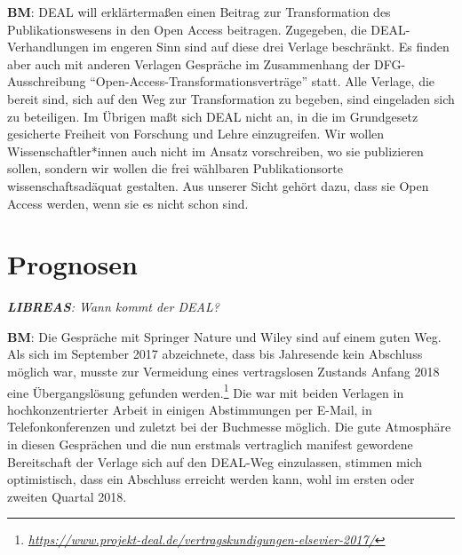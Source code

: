 \documentclass[a4paper,
fontsize=11pt,
oneside,
numbers=noperiodatend,
parskip=half-,
bibliography=totoc,
final
]{scrartcl}
\begin{document}
\textbf{BM}: DEAL will erklärtermaßen einen Beitrag zur Transformation
des Publikationswesens in den Open Access beitragen. Zugegeben, die
DEAL-Verhandlungen im engeren Sinn sind auf diese drei Verlage
beschränkt. Es finden aber auch mit anderen Verlagen Gespräche im
Zusammenhang der DFG-Ausschreibung
\enquote{Open-Access-Transformationsverträge} statt. Alle Verlage, die
bereit sind, sich auf den Weg zur Transformation zu begeben, sind
eingeladen sich zu beteiligen. Im Übrigen maßt sich DEAL nicht an, in
die im Grundgesetz gesicherte Freiheit von Forschung und Lehre
einzugreifen. Wir wollen Wissenschaftler*innen auch nicht im Ansatz
vorschreiben, wo sie publizieren sollen, sondern wir wollen die frei
wählbaren Publikationsorte wissenschaftsadäquat gestalten. Aus unserer
Sicht gehört dazu, dass sie Open Access werden, wenn sie es nicht schon
sind.

\section{Prognosen}\label{prognosen}

\emph{\textbf{LIBREAS}: Wann kommt der DEAL?}

\textbf{BM}: Die Gespräche mit Springer Nature und Wiley sind auf einem
guten Weg. Als sich im September 2017 abzeichnete, dass bis Jahresende
kein Abschluss möglich war, musste zur Vermeidung eines vertragslosen
Zustands Anfang 2018 eine Übergangslösung gefunden werden.\footnote{\href{https://www.projekt-deal.de/vertragskundigungen-elsevier-2017/}{\emph{https://www.projekt-deal.de/vertragskundigungen-elsevier-2017/}}}
Die war mit beiden Verlagen in hochkonzentrierter Arbeit in einigen
Abstimmungen per E-Mail, in Telefonkonferenzen und zuletzt bei der
Buchmesse möglich. Die gute Atmosphäre in diesen Gesprächen und die nun
erstmals vertraglich manifest gewordene Bereitschaft der Verlage sich
auf den DEAL-Weg einzulassen, stimmen mich optimistisch, dass ein
Abschluss erreicht werden kann, wohl im ersten oder zweiten Quartal
2018.
\end{document}
